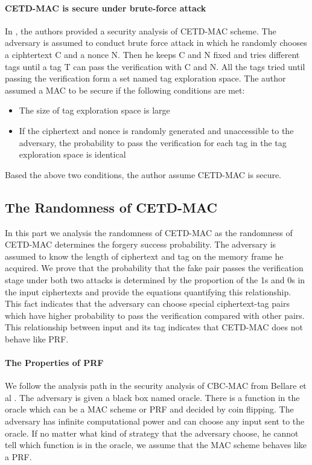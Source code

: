 \paragraph{CETD-MAC is secure under brute-force attack}
In \cite{cetd}, the authors provided a security analysis of CETD-MAC scheme. The adversary is assumed to conduct brute force attack in which he randomly chooses a ciphtertext C and a nonce N. Then he keeps C and N fixed and tries different tags until a tag T can pass the verification with C and N. All the tags tried until passing the verification form a set named tag exploration space. The author assumed a MAC to be secure if the following conditions are met:
\begin{itemize}
	\item The size of tag exploration space is large
	\item If the ciphertext and nonce is randomly generated and unaccessible to the adversary, the probability to pass the verification for each tag in the tag exploration space is identical
\end{itemize}
Based the above two conditions, the author assume CETD-MAC is secure.

\subsection{The Randomness of CETD-MAC}\label{sect:cetd-prf}
In this part we analysis the randomness of CETD-MAC as the randomness of CETD-MAC determines the forgery success probability. 
The adversary is assumed to know the length of ciphertext and tag on the memory frame he acquired. 
We prove that the probability that the fake pair passes the verification stage under both two attacks is determined by the proportion of the 1s and 0s in the input ciphertexts and provide the equations quantifying this relationship. This fact indicates that the adversary can choose special ciphertext-tag pairs which have higher probability to pass the verification compared with other pairs. This relationship between input and its tag indicates that CETD-MAC does not behave like PRF.  
 
\paragraph{The Properties of PRF}
We follow the analysis path in the security analysis of CBC-MAC from Bellare et
al \cite{cbc2000}. The adversary is given a black box named oracle. There is a function
in the oracle which can be a MAC scheme or PRF and decided by coin flipping. The adversary has infinite
computational power and can choose any input sent to the oracle. If no matter
what kind of strategy that the adversary choose, he cannot tell which function
is in the oracle, we assume that the MAC scheme behaves like a PRF.  

